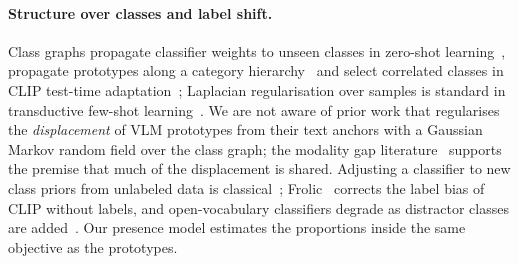 \paragraph{Structure over classes and label shift.}
Class graphs propagate classifier weights to unseen classes in zero-shot learning~\cite{kampffmeyer2019dgp}, propagate prototypes along a category hierarchy~\cite{liu2019ppn} and select correlated classes in CLIP test-time adaptation~\cite{huang2025cosmic}; Laplacian regularisation over samples is standard in transductive few-shot learning~\cite{ziko2020laplacianshot,zhou2004learning}. We are not aware of prior work that regularises the \emph{displacement} of VLM prototypes from their text anchors with a Gaussian Markov random field over the class graph; the modality gap literature~\cite{liang2022gap,schrodi2025two} supports the premise that much of the displacement is shared. Adjusting a classifier to new class priors from unlabeled data is classical~\cite{saerens2002adjusting,garg2020unified}; Frolic~\cite{zhu2024frolic} corrects the label bias of CLIP without labels, and open-vocabulary classifiers degrade as distractor classes are added~\cite{chen2026vocab}. Our presence model estimates the proportions inside the same objective as the prototypes.
